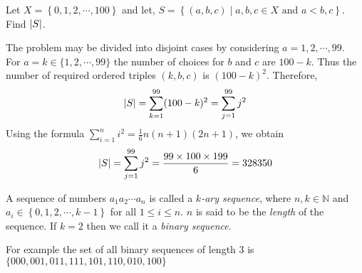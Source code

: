 \begin{problem}
    Let $X = \left\{0, 1, 2, \cdots, 100\right\}$ and let, 
    $S = \left\{ (a,b,c) \mid a,b,c\in X \text{ and } a<b,c \right\}$. Find $\left\lvert S \right\rvert$.
\end{problem}
\begin{sol}
    The problem may be divided into disjoint cases by considering $a=1,2,\cdots,99$. \\
    For $a=k\in \{1,2,\cdots,99\}$ the number of choices for $b$ and $c$ are $100-k$. 
    Thus the number of required ordered triples $(k,b,c)$ is $(100-k)^{2}$. Therefore,
    \[
        \left\lvert S \right\rvert = \sum_{k=1}^{99} (100-k)^{2} = \sum_{j=1}^{99} j^{2}
    \]
    Using the formula $\sum_{i=1}^{n} i^{2} = \frac{1}{6}n(n+1)(2n+1)$, we obtain
    \[
        \left\lvert S \right\rvert = \sum_{j=1}^{99} j^{2} = \frac{99\times 100\times 199}{6} = 328350
    \]
\end{sol}

\begin{definition}
    A sequence of numbers $a_{1}a_{2}\cdots a_{n}$ is called a \textit{$k$-ary sequence}, 
    where $n,k \in \mathbb{N}$ and $a_{i}\in \left\{0, 1, 2, \cdots, k-1\right\}$ for all 
    $1\leq i\leq n$. $n$ is said to be the \textit{length} of the sequence. If $k=2$ then 
    we call it a \textit{binary sequence}.
\end{definition}

For example the set of all binary sequences of length 3 is 
$\{000, 001, 011, 111, 101, 110, 010, 100\}$

